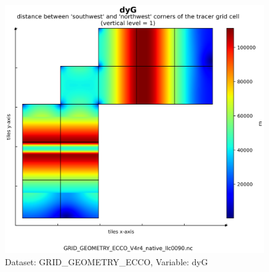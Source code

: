 \begin{figure}[H]
\centering
\includegraphics[scale=0.55]{../images/plots/v4r4/native_plots_coords/Geometry_Parameters_for_the_Lat-Lon-Cap_90_(llc90)_Native_Model_Grid_(Version_4_Release_4)/dyG.png}
\caption{Dataset: GRID\_GEOMETRY\_ECCO, Variable: dyG}
\label{tab:table-GRID_GEOMETRY_ECCO_dyG-Plot}
\end{figure}
\newpage
\pagebreak
